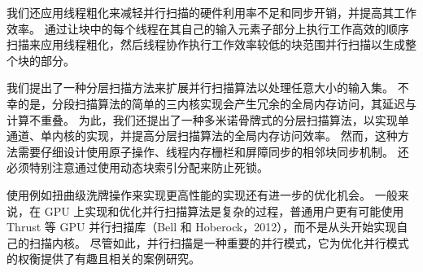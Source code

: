 我们还应用线程粗化来减轻并行扫描的硬件利用率不足和同步开销，并提高其工作效率。 通过让块中的每个线程在其自己的输入元素子部分上执行工作高效的顺序扫描来应用线程粗化，然后线程协作执行工作效率较低的块范围并行扫描以生成整个块的部分。

我们提出了一种分层扫描方法来扩展并行扫描算法以处理任意大小的输入集。 不幸的是，分段扫描算法的简单的三内核实现会产生冗余的全局内存访问，其延迟与计算不重叠。 为此，我们还提出了一种多米诺骨牌式的分层扫描算法，以实现单通道、单内核的实现，并提高分层扫描算法的全局内存访问效率。 然而，这种方法需要仔细设计使用原子操作、线程内存栅栏和屏障同步的相邻块同步机制。 还必须特别注意通过使用动态块索引分配来防止死锁。

使用例如扭曲级洗牌操作来实现更高性能的实现还有进一步的优化机会。 一般来说，在 GPU 上实现和优化并行扫描算法是复杂的过程，普通用户更有可能使用 Thrust 等 GPU 并行扫描库（Bell 和 Hoberock，2012），而不是从头开始实现自己的扫描内核。 尽管如此，并行扫描是一种重要的并行模式，它为优化并行模式的权衡提供了有趣且相关的案例研究。